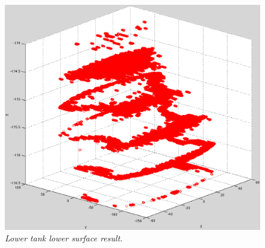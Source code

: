 \begin{figure}[htb]
  \hfill
  \begin{minipage}[b]{4.5in}
    \centering
    \centerline{\mbox{\includegraphics[width=4.5in]{data_extraction/images/MRI/surface4.eps}}}
  \end{minipage}
  \hfill
  \caption{\emph{Lower tank lower surface result.}}
  \label{fig:surface_result}
\end{figure}



